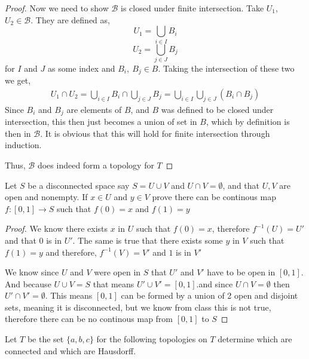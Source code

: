\documentclass[12pt]{article}
\newcommand      {\BB}        {{\mathscr B}}
\begin{document}
\begin{proof}
    Now we need to show $\BB$ is closed under finite intersection. Take $U_1$, $U_2\in \BB$. They are defined as, \[U_1 = \bigcup_{i \in I}B_i\] \[U_2 =\bigcup_{j \in J}B_j\] for $I$ and $J$ as some index and $B_i,\ B_j\in B$.
    Taking the intersection of these two we get,
    \begin{align*}
        U_1 \cap U_2 =  \bigcup_{i \in I}B_i \cap \bigcup_{j \in J}B_j =  \bigcup_{i \in I}\bigcup_{j \in J}(B_i \cap B_j)
    \end{align*}
    Since $B_i$ and $B_j$ are elements of $B$, and $B$ was defined to be closed under intersection, this then just becomes a union of set in $B$, which by definition is then in $\BB$. It is obvious that this will hold for finite intersection through induction. 

    Thus, $\BB$ does indeed form a topology for $T$
    
\end{proof}

 Let $S$ be a disconnected space say $S = U \cup V$ and $U \cap V = \emptyset$, and that $U,V$ are open and nonempty. If $x\in U$ and $y \in V$ prove there can be continous map $f:[0,1]\to S$ such that $f(0) = x$ and $f(1) = y$
\begin{proof}
    We know there exists $x$ in $U$ such that $f(0) = x$, therefore $f^{-1}(U) = U'$ and that 0 is in $U'$. The same is true that there exists some $y$ in $V$ such that $f(1) = y$ and therefore, $f^{-1}(V) = V'$ and $1$ is in $V'$ 

    We know since $U$ and $V$ were open in $S$ that $U'$ and $V'$ have to be open in $[0,1]$. And because $U\cup V = S$ that means $U'\cup V' = [0,1]$.and since $U \cap V = \emptyset$ then $U'\cap V'= \emptyset$. This means $[0,1]$ can be formed by a union of 2 open and disjoint sets, meaning it is disconnected, but we know from class this is not true, therefore there can be no continous map from $[0,1]$ to $S$


\end{proof}    

 Let $T$ be the set $\{a,b,c\}$ for the following topologies on $T$ determine which are connected and which are Hausdorff. 
\end{document}
